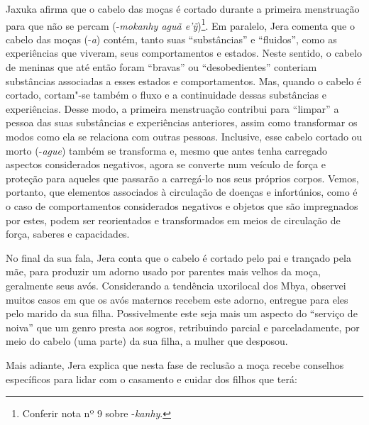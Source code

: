 \bigskip

Jaxuka afirma que o cabelo das moças é cortado durante a primeira
menstruação para que não se percam (-\emph{mokanhy aguã
e’ỹ})\footnote{Conferir nota nº 9 sobre -\emph{kanhy}.}. Em paralelo,
Jera comenta que o cabelo das moças (-\emph{a}) contém, tanto suas
``substâncias'' e ``fluidos'', como as experiências que viveram, seus
comportamentos e estados. Neste sentido, o cabelo de meninas que até
então foram ``bravas'' ou ``desobedientes'' conteriam substâncias
associadas a esses estados e comportamentos. Mas, quando o cabelo é
cortado, cortam"-se também o fluxo e a continuidade dessas substâncias e
experiências. Desse modo, a primeira menstruação contribui para
``limpar'' a pessoa das suas substâncias e experiências anteriores, assim
como transformar os modos como ela se relaciona com outras pessoas.
Inclusive, esse cabelo cortado ou morto (-\emph{ague}) também se transforma e,
mesmo que antes tenha carregado aspectos considerados negativos, agora
se converte num veículo de força e proteção para aqueles que passarão a
carregá-lo nos seus próprios corpos. Vemos, portanto, que elementos
associados à circulação de doenças e infortúnios, como é o caso de
comportamentos considerados negativos e objetos que são impregnados por
estes, podem ser reorientados e transformados em meios de circulação de
força, saberes e capacidades. 

No final da sua fala, Jera conta que o cabelo é cortado pelo pai e
trançado pela mãe, para produzir um adorno usado por parentes mais
velhos da moça, geralmente seus avós. Considerando a tendência
uxorilocal dos Mbya, observei muitos casos em que os avós maternos
recebem este adorno, entregue para eles pelo marido da sua filha.
Possivelmente este seja mais um aspecto do ``serviço de noiva'' que um
genro presta aos sogros, retribuindo parcial e parceladamente, por meio
do cabelo (uma parte) da sua filha, a mulher que desposou. 

Mais adiante, Jera explica que nesta fase de reclusão a moça recebe
conselhos específicos para lidar com o casamento e cuidar dos filhos
que terá: 


